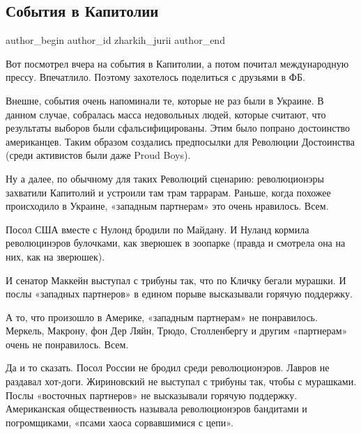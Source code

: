  
 
 
 
 
\subsection{События в Капитолии}
\label{sec:08_01_2021.fb.zharkih_jurii.1.kapitolii}
\ifcmt
  author_begin
   author_id zharkih_jurii
  author_end
\fi

Вот посмотрел вчера на события в Капитолии, а потом почитал международную
прессу. Впечатлило. Поэтому захотелось поделиться с друзьями в ФБ.

Внешне, события очень напоминали те, которые не раз были в Украине. В данном
случае, собралась масса недовольных людей, которые считают, что результаты
выборов были сфальсифицированы. Этим было попрано достоинство американцев.
Таким образом создались предпосылки для Революции Достоинства (среди активистов
были даже Proud Boys).

Ну а далее, по обычному для таких Революций сценарию: революционэры захватили
Капитолий и устроили там трам таррарам. Раньше, когда похожее происходило в
Украине, «западным партнерам» это очень нравилось. Всем.

Посол США вместе с Нулонд бродили по Майдану. И Нуланд кормила революцинэров
булочками, как зверюшек в зоопарке (правда и смотрела она на них, как на
зверюшек). 

И сенатор Маккейн выступал с трибуны так, что по Кличку бегали
мурашки. И послы «западных партнеров» в едином порыве высказывали горячую
поддержку.

А то, что произошло в Америке, «западным партнерам» не понравилось. Меркель,
Макрону, фон Дер Ляйн, Трюдо, Столленбергу и другим «партнерам» очень не
понравилось. Всем.

Да и то сказать. Посол России не бродил среди революционэров. Лавров не
раздавал хот-доги. Жириновский не выступал с трибуны так, чтобы с мурашками.
Послы «восточных партнеров» не высказывали горячую поддержку. Американская
общественность называла революционэров бандитами и погромщиками, «псами хаоса
сорвавшимися с цепи».

